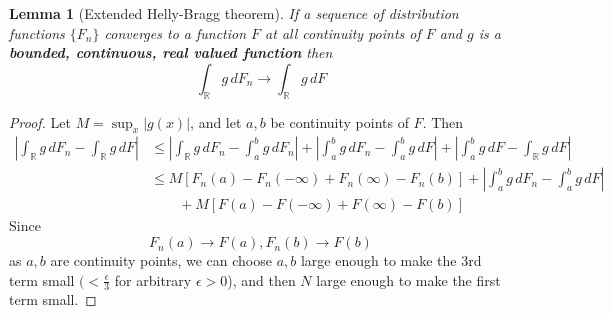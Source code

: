 \documentclass[10pt, oneside, reqno]{amsart}
\theoremstyle{plain}%
\newtheorem{lem}[thm]{Lemma}
\theoremstyle{definition}
\theoremstyle{remark}
\newcommand{\R}{\mathbb{R}}
\begin{document}
\begin{lem}[Extended Helly-Bragg theorem] \label{lem:extendedhelly}
    If a sequence of distribution functions $\{ F_n \}$ converges to a function $F$ at all continuity points of $F$ and $g$ is a \textbf{bounded, continuous, real valued function} then \[
        \int_\R g \,dF_n \rightarrow \int_\R g \, dF
    \]
\end{lem}
\begin{proof}
    Let $M = \sup_x | g(x) |$, and let $a,b$ be continuity points of $F$.  Then 
    \begin{align*}
        \left| \int_\R g \, dF_n - \int_\R g \, dF \right| &\leq \left| \int_\R g \, dF_n - \int_a^b g \, dF_n \right| + \left| \int_a^b g \, dF_n - \int_a^b g \, dF \right| + \left| \int_a^b g \, dF - \int_\R g \, dF \right| \\
        &\leq M[F_n(a) - F_n(-\infty) + F_n(\infty) - F_n(b)] + \left| \int_a^b g \, dF_n - \int_a^b g \, dF \right| \\
        &\qquad  + M[F(a) - F(-\infty) + F(\infty) - F(b)] 
    \end{align*} Since \[
        F_n(a) \rightarrow F(a), F_n(b) \rightarrow F(b)
    \] as $a, b$ are continuity points, we can choose $a, b$ large enough to make the 3rd term small $(< \frac{\epsilon}{3}$ for arbitrary $\epsilon > 0$), and then $N$ large enough to make the first term small. 
    

\end{proof}
\end{document}
